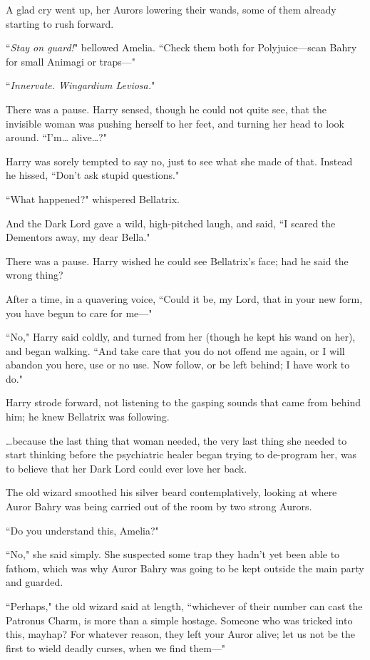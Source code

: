 A glad cry went up, her Aurors lowering their wands, some of them already starting to rush forward.

``\emph{Stay on guard!}" bellowed Amelia. ``Check them both for Polyjuice—scan Bahry for small Animagi or traps—"

\later

``\emph{Innervate. Wingardium Leviosa.}"

There was a pause. Harry sensed, though he could not quite see, that the invisible woman was pushing herself to her feet, and turning her head to look around. ``I'm{\ldots} alive{\ldots}?"

Harry was sorely tempted to say no, just to see what she made of that. Instead he hissed, ``Don't ask stupid questions."

``What happened?" whispered Bellatrix.

And the Dark Lord gave a wild, high-pitched laugh, and said, ``I scared the Dementors away, my dear Bella."

There was a pause. Harry wished he could see Bellatrix's face; had he said the wrong thing?

After a time, in a quavering voice, ``Could it be, my Lord, that in your new form, you have begun to care for me—"

``No," Harry said coldly, and turned from her (though he kept his wand on her), and began walking. ``And take care that you do not offend me again, or I will abandon you here, use or no use. Now follow, or be left behind; I have work to do."

Harry strode forward, not listening to the gasping sounds that came from behind him; he knew Bellatrix was following.

{\ldots}because the last thing that woman needed, the very last thing she needed to start thinking before the psychiatric healer began trying to de-program her, was to believe that her Dark Lord could ever love her back.

\later

The old wizard smoothed his silver beard contemplatively, looking at where Auror Bahry was being carried out of the room by two strong Aurors.

``Do you understand this, Amelia?"

``No," she said simply. She suspected some trap they hadn't yet been able to fathom, which was why Auror Bahry was going to be kept outside the main party and guarded.

``Perhaps," the old wizard said at length, ``whichever of their number can cast the Patronus Charm, is more than a simple hostage. Someone who was tricked into this, mayhap? For whatever reason, they left your Auror alive; let us not be the first to wield deadly curses, when we find them—"


